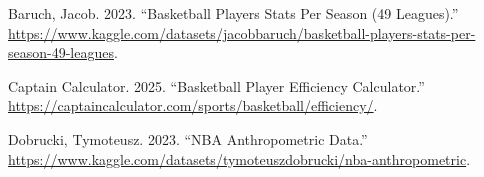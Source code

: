 \documentclass[
  letterpaper,
  DIV=11,
  numbers=noendperiod]{scrartcl}
\newlength{\cslhangindent}
\newenvironment{CSLReferences}[2] %
 {\begin{list}{}{%
  \setlength{\itemindent}{0pt}
  \setlength{\leftmargin}{0pt}
  \setlength{\parsep}{0pt}
  \ifodd #1
   \setlength{\leftmargin}{\cslhangindent}
   \setlength{\itemindent}{-1\cslhangindent}
  \fi
  \setlength{\itemsep}{#2\baselineskip}}}
 {\end{list}}
\begin{document}
\label{refs}
\begin{CSLReferences}{1}{0}
Baruch, Jacob. 2023. {``Basketball Players Stats Per Season (49
Leagues).''}
\url{https://www.kaggle.com/datasets/jacobbaruch/basketball-players-stats-per-season-49-leagues}.

Captain Calculator. 2025. {``Basketball Player Efficiency Calculator.''}
\url{https://captaincalculator.com/sports/basketball/efficiency/}.

Dobrucki, Tymoteusz. 2023. {``NBA Anthropometric Data.''}
\url{https://www.kaggle.com/datasets/tymoteuszdobrucki/nba-anthropometric}.

\end{CSLReferences}
\end{document}

